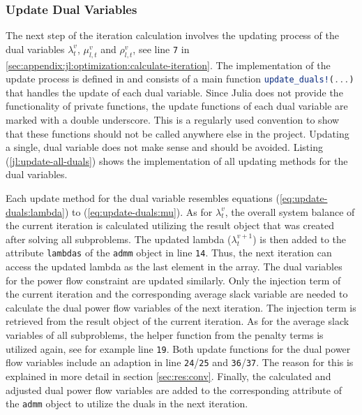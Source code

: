 \subsubsection*{Update Dual Variables}

The next step of the iteration calculation involves the updating process of the dual variables $\lambda_{t}^v$, $\mu_{l,t}^v$ and $\rho_{l,t}^v$, see line \texttt{7} in \ref{sec:appendix:jl:optimization:calculate-iteration}. The implementation of the update process is defined in  and consists of a main function \lstinline[language=julia]{update_duals!(...)} that handles the update of each dual variable. Since Julia does not provide the functionality of private functions, the update functions of each dual variable are marked with a double underscore. This is a regularly used convention to show that these functions should not be called anywhere else in the project. Updating a single, dual variable does not make sense and should be avoided. Listing (\ref{jl:update-all-duals}) shows the implementation of all updating methods for the dual variables.



Each update method for the dual variable resembles equations (\ref{eq:update-duals:lambda}) to (\ref{eq:update-duals:mu}). As for $\lambda_{t}^v$, the overall system balance of the current iteration is calculated utilizing the result object that was created after solving all subproblems. The updated lambda ($\lambda_{t}^{v+1}$) is then added to the attribute \lstinline[language=julia]{lambdas} of the \lstinline[language=julia]{admm} object in line \texttt{14}. Thus, the next iteration can access the updated lambda as the last element in the array. The dual variables for the power flow constraint are updated similarly. Only the injection term of the current iteration and the corresponding average slack variable are needed to calculate the dual power flow variables of the next iteration. The injection term is retrieved from the result object of the current iteration. As for the average slack variables of all subproblems, the helper function from the penalty terms is utilized again, see for example line \texttt{19}. Both update functions for the dual power flow variables include an adaption in line \texttt{24}/\texttt{25} and \texttt{36}/\texttt{37}. The reason for this is explained in more detail in section \ref{sec:res:conv}. Finally, the calculated and adjusted dual power flow variables are added to the corresponding attribute of the \lstinline[language=julia]{admm} object to utilize the duals in the next iteration.


